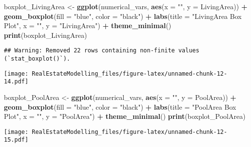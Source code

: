 \documentclass[
]{article}
\newenvironment{Shaded}{\begin{snugshade}}{\end{snugshade}}
\newcommand{\AttributeTok}[1]{\textcolor[rgb]{0.13,0.29,0.53}{#1}}
\newcommand{\FunctionTok}[1]{\textcolor[rgb]{0.13,0.29,0.53}{\textbf{#1}}}
\newcommand{\NormalTok}[1]{#1}
\newcommand{\OtherTok}[1]{\textcolor[rgb]{0.56,0.35,0.01}{#1}}
\newcommand{\SpecialCharTok}[1]{\textcolor[rgb]{0.81,0.36,0.00}{\textbf{#1}}}
\newcommand{\StringTok}[1]{\textcolor[rgb]{0.31,0.60,0.02}{#1}}
\begin{document}
\begin{Shaded}
\begin{Highlighting}[]
\NormalTok{boxplot\_LivingArea }\OtherTok{\textless{}{-}} \FunctionTok{ggplot}\NormalTok{(numerical\_vars, }\FunctionTok{aes}\NormalTok{(}\AttributeTok{x =} \StringTok{""}\NormalTok{, }\AttributeTok{y =}\NormalTok{ LivingArea)) }\SpecialCharTok{+}
  \FunctionTok{geom\_boxplot}\NormalTok{(}\AttributeTok{fill =} \StringTok{"blue"}\NormalTok{, }\AttributeTok{color =} \StringTok{"black"}\NormalTok{) }\SpecialCharTok{+}
  \FunctionTok{labs}\NormalTok{(}\AttributeTok{title =} \StringTok{"LivingArea Box Plot"}\NormalTok{, }\AttributeTok{x =} \StringTok{""}\NormalTok{, }\AttributeTok{y =} \StringTok{"LivingArea"}\NormalTok{) }\SpecialCharTok{+}
  \FunctionTok{theme\_minimal}\NormalTok{()}
\FunctionTok{print}\NormalTok{(boxplot\_LivingArea)}
\end{Highlighting}
\end{Shaded}

\begin{verbatim}
## Warning: Removed 22 rows containing non-finite values (`stat_boxplot()`).
\end{verbatim}

\texttt{[image: RealEstateModelling\_files/figure-latex/unnamed-chunk-12-14.pdf]}

\begin{Shaded}
\begin{Highlighting}[]
\NormalTok{boxplot\_PoolArea }\OtherTok{\textless{}{-}} \FunctionTok{ggplot}\NormalTok{(numerical\_vars, }\FunctionTok{aes}\NormalTok{(}\AttributeTok{x =} \StringTok{""}\NormalTok{, }\AttributeTok{y =}\NormalTok{ PoolArea)) }\SpecialCharTok{+}
  \FunctionTok{geom\_boxplot}\NormalTok{(}\AttributeTok{fill =} \StringTok{"blue"}\NormalTok{, }\AttributeTok{color =} \StringTok{"black"}\NormalTok{) }\SpecialCharTok{+}
  \FunctionTok{labs}\NormalTok{(}\AttributeTok{title =} \StringTok{"PoolArea Box Plot"}\NormalTok{, }\AttributeTok{x =} \StringTok{""}\NormalTok{, }\AttributeTok{y =} \StringTok{"PoolArea"}\NormalTok{) }\SpecialCharTok{+}
  \FunctionTok{theme\_minimal}\NormalTok{()}
\FunctionTok{print}\NormalTok{(boxplot\_PoolArea)}
\end{Highlighting}
\end{Shaded}

\texttt{[image: RealEstateModelling\_files/figure-latex/unnamed-chunk-12-15.pdf]}
\end{document}
